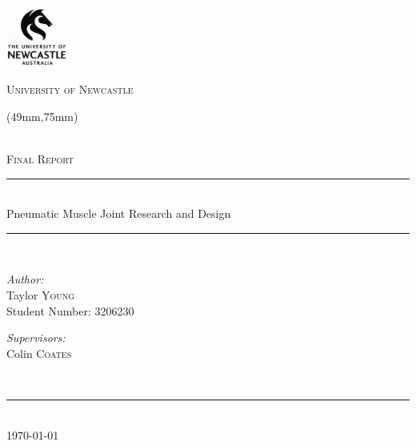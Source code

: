\begin{titlepage}
    \begin{center}
        \begin{center}
            \includegraphics[width=0.15\textwidth]{./figures/uon_logo.png}
            
            \textsc{\LARGE University of Newcastle}\\[1cm]
        \end{center}
        
        \begin{textblock*}{133mm}(49mm,75mm)  %
            \begin{minipage}[t][65mm][t]{133mm}
                \centering
                ~\\[0.5cm]
                \textsc{\Large Final Report}\\[0.5cm]
            
                \hrule ~\\[0.5cm]
                { \Large Pneumatic Muscle Joint Research and Design\\[0.5cm] }
                \hrule ~\\[0.5cm]
            
                \noindent
                \begin{minipage}{0.4\textwidth}
                    \begin{flushleft} \large
                        \emph{Author:}\\
                        Taylor \textsc{Young}\\
                        Student Number: 3206230
                    \end{flushleft}
                \end{minipage}%
                \begin{minipage}{0.4\textwidth}
                    \begin{flushright} \large
                        \emph{Supervisors:} \\
                        Colin \textsc{Coates}\\
                    \end{flushright}
                \end{minipage}\\[0.5cm]
                \hrule ~\\[0.3cm]
                {\large \today}
            \end{minipage}
        \end{textblock*}
    \end{center}
    

\end{titlepage}
